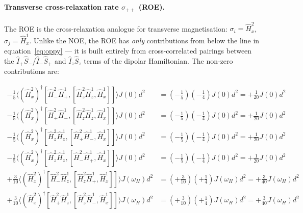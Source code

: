 \documentclass[notitlepage,11pt]{article}
\begin{document}
\paragraph{Transverse cross-relaxation rate $\sigma_{++}$ (ROE).} The ROE is the cross-relaxation analogue for transverse magnetisation: $\sigma_i=\hat{H}^2_x$, $\sigma_j=\hat{H}^1_x$. Unlike the NOE, the ROE has \emph{only} contributions from below the line in equation~\ref{eq:oppy} — it is built entirely from cross-correlated pairings between the $\hat{I}_+\hat{S}_-$/$\hat{I}_-\hat{S}_+$ and $\hat{I}_z\hat{S}_z$ terms of the dipolar Hamiltonian. The non-zero contributions are:


\begin{small}\begin{equation*}\begin{array}{rl}
      -\frac{1}{5}\langle (\hat{H}^2_x)^{\dagger} [\hat{H}^2_- \hat{H}^1_+ ,[\hat{H}^2_z\hat{H}^1_z,\hat{H}^1_x]] \rangle J\left(0\right)d^2 &= ( -\frac{1}{5})( -\frac{1}{4})J\left(0\right) d^2 =  +\frac{1}{20}J\left(0\right) d^2\\

 -\frac{1}{5}\langle (\hat{H}^2_x)^{\dagger} [\hat{H}^2_+ \hat{H}^1_- ,[\hat{H}^2_z\hat{H}^1_z,\hat{H}^1_x]] \rangle J\left(0\right)d^2 &= ( -\frac{1}{5})( -\frac{1}{4})J\left(0\right) d^2 =  +\frac{1}{20}J\left(0\right) d^2\\

 -\frac{1}{5}\langle (\hat{H}^2_x)^{\dagger} [\hat{H}^2_z\hat{H}^1_z,[\hat{H}^2_+ \hat{H}^1_- ,\hat{H}^1_x]] \rangle J\left(0\right)d^2 &= ( -\frac{1}{5})( -\frac{1}{4})J\left(0\right) d^2 =  +\frac{1}{20}J\left(0\right) d^2\\

 -\frac{1}{5}\langle (\hat{H}^2_x)^{\dagger} [\hat{H}^2_z\hat{H}^1_z,[\hat{H}^2_- \hat{H}^1_+ ,\hat{H}^1_x]] \rangle J\left(0\right)d^2 &= ( -\frac{1}{5})( -\frac{1}{4})J\left(0\right) d^2 =  +\frac{1}{20}J\left(0\right) d^2\\

 +\frac{3}{10}\langle (\hat{H}^2_x)^{\dagger} [\hat{H}^2_- \hat{H}^1_z,[\hat{H}^2_z\hat{H}^1_+ ,\hat{H}^1_x]] \rangle J\left(\omega_H\right)d^2 &= ( +\frac{3}{10})( +\frac{1}{4})J\left(\omega_H\right) d^2 =  +\frac{3}{40}J\left(\omega_H\right) d^2\\

 +\frac{3}{10}\langle (\hat{H}^2_x)^{\dagger} [\hat{H}^2_+ \hat{H}^1_z,[\hat{H}^2_z\hat{H}^1_- ,\hat{H}^1_x]] \rangle J\left(\omega_H\right)d^2 &= ( +\frac{3}{10})( +\frac{1}{4})J\left(\omega_H\right) d^2 =  +\frac{3}{40}J\left(\omega_H\right) d^2\\


\end{array}
\end{equation*}
\end{small}
\end{document}
